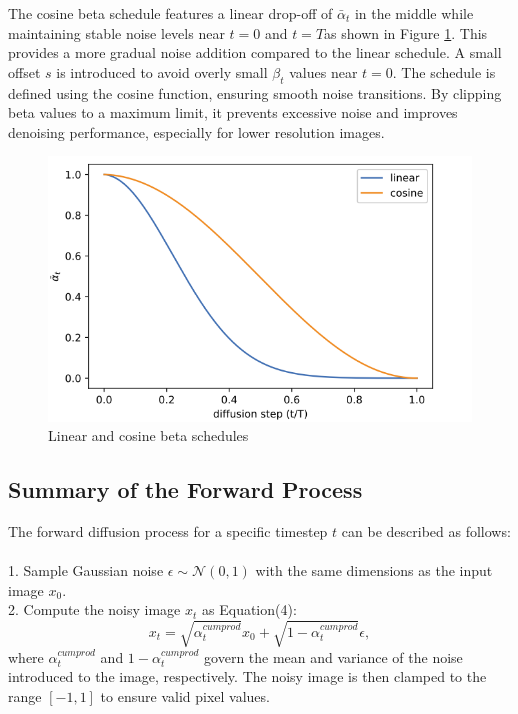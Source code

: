 \documentclass[letterpaper]{article} %
\begin{document}
The cosine beta schedule features a linear drop-off of $\bar{\alpha}_t$ in the middle while maintaining stable noise levels near $t = 0$ and $t = T$as shown in Figure \ref{fig:figure1}. This provides a more gradual noise addition compared to the linear schedule. A small offset $s$ is introduced to avoid overly small $\beta_t$ values near $t = 0$. The schedule is defined using the cosine function, ensuring smooth noise transitions. By clipping beta values to a maximum limit, it prevents excessive noise and improves denoising performance, especially for lower resolution images.

\begin{figure}[htbp]
    \centering
    \includegraphics[width=0.88\linewidth]{f1.png} %
    \caption{Linear and cosine beta schedules}
    \label{fig:figure1}
\end{figure}

\subsection{Summary of the Forward Process}
The forward diffusion process for a specific timestep $t$ can be described as follows: \\\\
1. Sample Gaussian noise $\epsilon \sim \mathcal{N}(0, 1)$ with the same dimensions as the input image $x_0$. \\
2. Compute the noisy image $x_t$ as Equation(4):
\begin{equation}
x_t = \sqrt{\alpha^{cumprod}_t} x_0 + \sqrt{1 - \alpha^{cumprod}_t} \epsilon,
\end{equation}
\noindent where $\alpha^{cumprod}_t$ and $1 - \alpha^{cumprod}_t$ govern the mean and variance of the noise introduced to the image, respectively. The noisy image is then clamped to the range $[-1, 1]$ to ensure valid pixel values.
\end{document}
